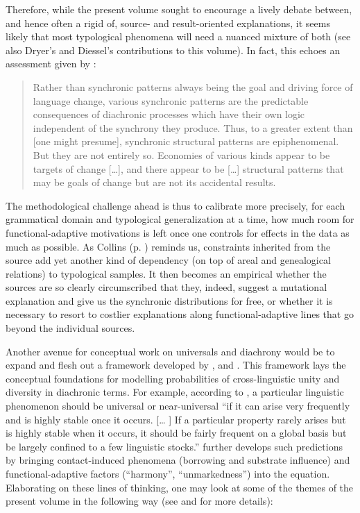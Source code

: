 \documentclass[output=paper]{langsci/langscibook}
\begin{document}
Therefore, while the present volume sought to encourage a lively debate between, and hence often a rigid  of, source- and result-oriented explanations, it seems likely that most typological phenomena will need a nuanced mixture of both (see also Dryer’s and Diessel’s contributions to this volume). In fact, this echoes an assessment given by \citet[287--288]{Nichols2008_Diach}:

\begin{quote}
Rather than synchronic patterns always being the goal and driving force of language change, various synchronic patterns are the predictable consequences of diachronic processes which have their own logic independent of the synchrony they produce. Thus, to a greater extent than [one might presume], synchronic structural patterns are epiphenomenal. But they are not entirely so. Economies of various kinds appear to be targets of change […], and there appear to be […] structural patterns that may be goals of change but are not its accidental results.
\end{quote}

The methodological challenge ahead is thus to calibrate more precisely, for each grammatical domain and typological generalization at a time, how much room for functional-adaptive motivations is left once one controls for  effects in the data as much as possible. As Collins (p. \pageref{p:collins:dependency}) reminds us, constraints inherited from the source add yet another kind of dependency (on top of areal and genealogical relations) to typological samples. It then becomes an empirical  whether the sources are so clearly circumscribed that they, indeed, suggest a mutational explanation and give us the synchronic distributions for free, or whether it is necessary to resort to costlier explanations along functional-adaptive lines that go beyond the individual sources.

Another avenue for conceptual work on universals and diachrony would be to expand and flesh out a framework developed by \citet{Greenberg1978_Diachr}, \citet{Nichols1992,Nichols2003} and \citet{Bickel2013}. This framework lays the conceptual foundations for modelling probabilities of cross-linguistic unity and diversity in diachronic terms. For example, according to \citet[76]{Greenberg1978_Diachr}, a particular linguistic phenomenon should be universal or near-universal “if it can arise very frequently and is highly stable once it occurs. [… ] If a particular property rarely arises but is highly stable when it occurs, it should be fairly frequent on a global basis but be largely confined to a few linguistic stocks.” \citet[287--288]{Nichols2008_Diach} further develops such predictions by bringing contact-induced phenomena (borrowing and substrate influence) and functional-adaptive factors (“harmony”, “unmarkedness”) into the equation. Elaborating on these lines of thinking, one may look at some of the themes of the present volume in the following way (see \citealt{Grossman2016} and \citealt{GrossmanEtAl2018} for more details):
\end{document}
